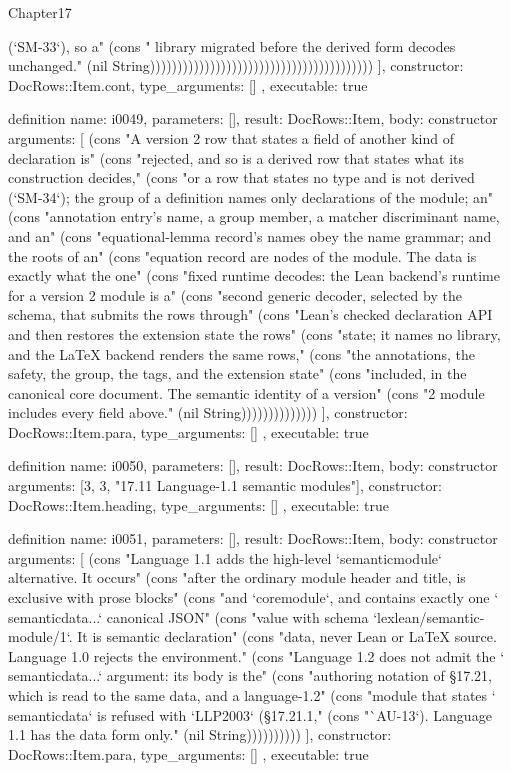 \begin{lexlean}{Chapter17}
\begin{semanticmodule}
{{(`SM-33`), so a" (cons "  library migrated before the derived form decodes unchanged." (nil String)))))))))))))))))))))))))))))))))))))))))
    ],
    constructor: DocRows::Item.cont,
    type_arguments: []
  },
  executable: true
}

definition{
  name: i0049,
  parameters: [],
  result: DocRows::Item,
  body: constructor{
    arguments: [
      (cons "A version 2 row that states a field of another kind of declaration is" (cons "rejected, and so is a derived row that states what its construction decides," (cons "or a row that states no type and is not derived (`SM-34`); the group of a definition names only declarations of the module; an" (cons "annotation entry's name, a group member, a matcher discriminant name, and an" (cons "equational-lemma record's names obey the name grammar; and the roots of an" (cons "equation record are nodes of the module. The data is exactly what the one" (cons "fixed runtime decodes: the Lean backend's runtime for a version 2 module is a" (cons "second generic decoder, selected by the schema, that submits the rows through" (cons "Lean's checked declaration API and then restores the extension state the rows" (cons "state; it names no library, and the LaTeX backend renders the same rows," (cons "the annotations, the safety, the group, the tags, and the extension state" (cons "included, in the canonical core document. The semantic identity of a version" (cons "2 module includes every field above." (nil String))))))))))))))
    ],
    constructor: DocRows::Item.para,
    type_arguments: []
  },
  executable: true
}

definition{
  name: i0050,
  parameters: [],
  result: DocRows::Item,
  body: constructor{
    arguments: [3, 3, "17.11 Language-1.1 semantic modules"],
    constructor: DocRows::Item.heading,
    type_arguments: []
  },
  executable: true
}

definition{
  name: i0051,
  parameters: [],
  result: DocRows::Item,
  body: constructor{
    arguments: [
      (cons "Language 1.1 adds the high-level `semanticmodule` alternative. It occurs" (cons "after the ordinary module header and title, is exclusive with prose blocks" (cons "and `coremodule`, and contains exactly one `\\semanticdata{...}` canonical JSON" (cons "value with schema `lexlean/semantic-module/1`. It is semantic declaration" (cons "data, never Lean or LaTeX source. Language 1.0 rejects the environment." (cons "Language 1.2 does not admit the `\\semanticdata{...}` argument: its body is the" (cons "authoring notation of §17.21, which is read to the same data, and a language-1.2" (cons "module that states `\\semanticdata` is refused with `LLP2003` (§17.21.1," (cons "`AU-13`). Language 1.1 has the data form only." (nil String))))))))))
    ],
    constructor: DocRows::Item.para,
    type_arguments: []
  },
  executable: true
}


\end{semanticmodule}
\end{lexlean}
